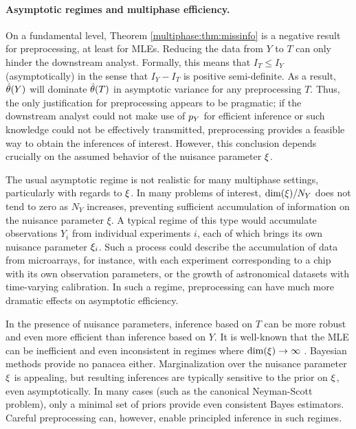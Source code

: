 \paragraph{Asymptotic regimes and multiphase efficiency.}
On a fundamental level, Theorem \ref{multiphase:thm:missinfo} is a negative result for preprocessing, at least for MLEs.
Reducing the data from $Y$ to $T$ can only hinder the downstream analyst.
Formally, this means that $I_T \leq I_Y$ (asymptotically) in the sense that $I_Y - I_T$ is positive semi-definite.
As a result, $\hat{\theta}(Y)$ will dominate $\hat{\theta}(T)$ in asymptotic variance for any preprocessing $T$.
Thus, the only justification for preprocessing appears to be pragmatic; if the downstream analyst could not make use of $p_Y$ for efficient inference or such knowledge could not be effectively transmitted, preprocessing provides a feasible way to obtain the inferences of interest.
However, this conclusion depends crucially on the assumed behavior of the nuisance parameter $\xi$.

The usual asymptotic regime is not realistic for many multiphase settings, particularly with regards to $\xi$.
In many problems of interest, $\dim(\xi) / N_Y $ does not tend to zero as $N_Y$ increases, preventing sufficient accumulation of information on the nuisance parameter $\xi$.
A typical regime of this type would accumulate observations $Y_i$ from individual experiments $i$, each of which brings its own nuisance parameter $\xi_i$.
Such a process could describe the accumulation of data from microarrays, for instance, with each experiment corresponding to a chip with its own observation parameters, or the growth of astronomical datasets with time-varying calibration.
In such a regime, preprocessing can have much more dramatic effects on asymptotic efficiency.

In the presence of nuisance parameters, inference based on $T$ can be more robust and even more efficient than inference based on $Y$.
It is well-known that the MLE can be inefficient and even inconsistent in regimes where $\dim(\xi) \rightarrow \infty$ \citep[going back to at least][]{NeymanScott1948}.
Bayesian methods provide no panacea either.
Marginalization over the nuisance parameter $\xi$ is appealing, but resulting inferences are typically sensitive to the prior on $\xi$, even asymptotically.
In many cases (such as the canonical Neyman-Scott problem), only a minimal set of priors provide even consistent Bayes estimators.
Careful preprocessing can, however, enable principled inference in such regimes.

